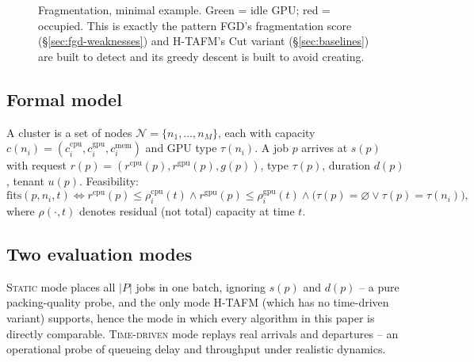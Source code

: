 \documentclass[11pt]{article}
\newcommand{\N}{\mathcal{N}}
\begin{document}
\begin{figure}[h]
\centering
{}
\caption{Fragmentation, minimal example. Green = idle GPU; red = occupied.
This is exactly the pattern FGD's fragmentation score
(\S\ref{sec:fgd-weaknesses}) and H-TAFM's Cut variant (\S\ref{sec:baselines}) are built to
detect and its greedy descent is built to avoid creating.}
\label{fig:fragmentation-concept}
\end{figure}

\subsection{Formal model}
A cluster is a set of nodes $\N=\{n_1,\dots,n_M\}$, each with capacity
$c(n_i)=(c^{\text{cpu}}_i, c^{\text{gpu}}_i, c^{\text{mem}}_i)$ and GPU
type $\tau(n_i)$. A job $p$ arrives at $s(p)$ with request
$r(p)=(r^{\text{cpu}}(p), r^{\text{gpu}}(p), g(p))$, type $\tau(p)$,
duration $d(p)$, tenant $u(p)$. Feasibility:
\[
  \mathrm{fits}(p,n_i,t) \iff r^{\text{cpu}}(p)\leq\rho^{\text{cpu}}_i(t)
  \wedge r^{\text{gpu}}(p)\leq\rho^{\text{gpu}}_i(t)
  \wedge \big(\tau(p)=\varnothing \vee \tau(p)=\tau(n_i)\big),
\]
where $\rho(\cdot,t)$ denotes residual (not total) capacity at time $t$.

\subsection{Two evaluation modes}
\textsc{Static} mode places all $|P|$ jobs in one batch, ignoring $s(p)$
and $d(p)$ -- a pure packing-quality probe, and the only mode H-TAFM (which
has no time-driven variant) supports, hence the mode in which every
algorithm in this paper is directly comparable. \textsc{Time-driven} mode
replays real arrivals and departures -- an operational probe of queueing
delay and throughput under realistic dynamics.
\end{document}
